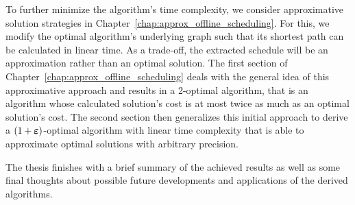 To further minimize the algorithm's time complexity, we consider approximative solution strategies in Chapter~\ref{chap:approx_offline_scheduling}. For this, we modify the optimal algorithm's underlying graph such that its shortest path can be calculated in linear time. As a trade-off, the extracted schedule will be an approximation rather than an optimal solution. The first section of Chapter~\ref{chap:approx_offline_scheduling} deals with the general idea of this approximative approach and results in a 2-optimal algorithm, that is an algorithm whose calculated solution's cost is at most twice as much as an optimal solution's cost. The second section then generalizes this initial approach to derive a $(1+\boldsymbol\varepsilon)$-optimal algorithm with linear time complexity that is able to approximate optimal solutions with arbitrary precision.

The thesis finishes with a brief summary of the achieved results as well as some final thoughts about possible future developments and applications of the derived algorithms.

